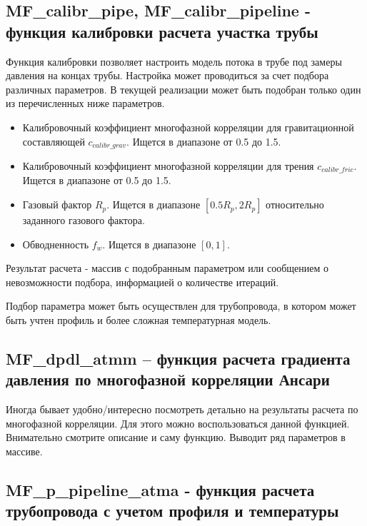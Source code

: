 \subsection{MF\_calibr\_pipe, MF\_calibr\_pipeline - функция калибровки расчета участка трубы}

Функция калибровки позволяет настроить модель потока в трубе под замеры давления на концах трубы. Настройка может проводиться за счет подбора различных параметров. В текущей реализации может быть подобран только один из перечисленных ниже параметров.

\begin{itemize}
	\item Калибровочный коэффициент многофазной корреляции для гравитационной составляющей  $c_{calibr\_grav}$. Ищется в диапазоне от 0.5 до 1.5.
	\item Калибровочный коэффициент многофазной корреляции для трения $c_{calibr\_fric}$. Ищется в диапазоне от 0.5 до 1.5.
	\item Газовый фактор $R_p$. Ищется в диапазоне $[0.5 R_p, 2 R_p]$ относительно заданного газового фактора. 
	\item Обводненность $f_w$.  Ищется в диапазоне $[0, 1]$.  
\end{itemize}

Результат расчета - массив с подобранным параметром или сообщением о невозможности подбора, информацией о количестве итераций. 


Подбор параметра может быть осуществлен для трубопровода, в котором может быть учтен профиль и более сложная температурная модель.




\subsection{MF\_dpdl\_atmm – функция расчета градиента давления по многофазной корреляции Ансари}  
Иногда бывает удобно/интересно посмотреть детально на результаты расчета по многофазной корреляции. Для этого можно воспользоваться данной функцией. Внимательно смотрите описание и саму функцию. Выводит ряд параметров в массиве.

\subsection{MF\_p\_pipeline\_atma - функция расчета трубопровода с учетом профиля и температуры}

